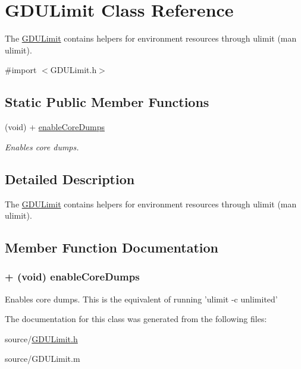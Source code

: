 \hypertarget{interface_g_d_u_limit}{
\section{GDULimit Class Reference}
\label{interface_g_d_u_limit}
}


The \hyperlink{interface_g_d_u_limit}{GDULimit} contains helpers for environment resources through ulimit (man ulimit).  


{\ttfamily \#import $<$GDULimit.h$>$}\subsection*{Static Public Member Functions}
\begin{DoxyCompactItemize}
\item 
(void) + \hyperlink{interface_g_d_u_limit_ab657cde9b16d4cb6f5b77fd96fe917e0}{enableCoreDumps}
\begin{DoxyCompactList}\small\item\em Enables core dumps. \item\end{DoxyCompactList}\end{DoxyCompactItemize}


\subsection{Detailed Description}
The \hyperlink{interface_g_d_u_limit}{GDULimit} contains helpers for environment resources through ulimit (man ulimit). 

\subsection{Member Function Documentation}
\hypertarget{interface_g_d_u_limit_ab657cde9b16d4cb6f5b77fd96fe917e0}{
\subsubsection[{enableCoreDumps}]{\setlength{\rightskip}{0pt plus 5cm}+ (void) enableCoreDumps }}
\label{interface_g_d_u_limit_ab657cde9b16d4cb6f5b77fd96fe917e0}


Enables core dumps. This is the equivalent of running 'ulimit -\/c unlimited' 

The documentation for this class was generated from the following files:\begin{DoxyCompactItemize}
\item 
source/\hyperlink{_g_d_u_limit_8h}{GDULimit.h}\item 
source/GDULimit.m\end{DoxyCompactItemize}
